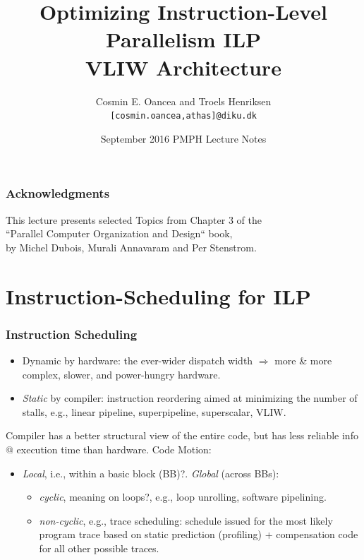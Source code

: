 \documentclass{beamer}
\title[VLIW Arch]{Optimizing Instruction-Level Parallelism ILP\\VLIW Architecture}
\author[C.~Oancea]{Cosmin E. Oancea and Troels Henriksen\\{\tt [cosmin.oancea,athas]@diku.dk}}
\institute{Department of Computer Science (DIKU)\\University of Copenhagen}
\date[Sept 2016]{September 2016 PMPH Lecture Notes}
\renewcommand{\emph}[1]{\textcolor{structure}{#1}}
\newcommand{\emp}[1]{\textcolor{DikuRed}{ #1}}
\begin{document}
\titleslide



\begin{frame}
\frametitle{Acknowledgments}
This lecture presents selected Topics from Chapter 3 of the\\
``Parallel Computer Organization and Design`` book,\\
by Michel Dubois, Murali Annavaram and Per Stenstrom.
\end{frame}


\begin{frame}[fragile]
	\tableofcontents
\end{frame}


\section{Instruction-Scheduling for ILP}


\begin{frame}[fragile,t]
\frametitle{Instruction Scheduling}

\begin{itemize}
    \item {Dynamic} by hardware: the ever-wider dispatch width
            $\Rightarrow$ 
            more \& more complex, slower, and power-hungry hardware. \smallskip
 
    \item {\em Static} by compiler: instruction reordering aimed at
            minimizing the number of stalls,
            e.g., linear pipeline, superpipeline, superscalar, VLIW.  
\end  {itemize}
\pause\bigskip

Compiler has a better structural view of the entire code, but has less reliable info 
@ execution time than hardware. Code Motion:
\smallskip
\begin{itemize}
    \item \emph{\em Local}, i.e., within a \alert{basic block (BB)?}. \emph{\em Global} (across BBs): 
    \begin{itemize}
        \item \emp{\em cyclic}, meaning on \alert{loops?}, e.g., loop unrolling, software pipelining.
        \item \emp{\em non-cyclic}, e.g., trace scheduling: schedule issued for the most likely 
                program trace based on static prediction (profiling) + compensation code 
                for all other possible traces.
    \end  {itemize}
\end  {itemize}

\end{frame}
\end{document}
